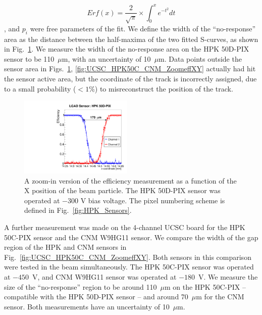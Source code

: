 \documentclass[preprint,1p]{elsarticle}
\begin{document}
\begin{equation} Erf(x)= \frac{2}{\sqrt{\pi}}\times \int_{0}^{x}e^{-t^2}dt
\end{equation} , and $p_i$ were free parameters of the fit. We define the width
of the ``no-response'' area as the distance between the half-maxima of the two
fitted S-curves, as shown in Fig.~\ref{fig:FNAL_HPK50_ZoomeffXY}. We measure the
width of the no-response area on the HPK 50D-PIX sensor to be 110~$\mu$m, with
an uncertainty of 10~$\mu$m. Data points outside the sensor area in
Figs.~\ref{fig:FNAL_HPK50_ZoomeffXY}, \ref{fig:UCSC_HPK50C_CNM_ZoomeffXY}
actually had hit the sensor active area, but the coordinate of the track is incorrectly
assigned, due to a small probability ($<1$\%) to misreconstruct the position of
the track.


\begin{figure}[!htbp] 
\centering
\includegraphics[width=0.48\textwidth]{figs/KUBoard_HPK50DPix_Run638-781/Eff_vs_X_HPK50DPIX_Ch1_2_fit.pdf} 
\caption{A zoom-in version of the efficiency measurement as a function of the X position of the beam particle.
The HPK 50D-PIX sensor was operated at $-300$ V bias voltage. The pixel numbering scheme is defined in Fig.~\ref{fig:HPK_Sensors}.} 
\label{fig:FNAL_HPK50_ZoomeffXY} 
\end{figure} 

A further measurement was made on the 4-channel UCSC board for the HPK 50C-PIX
sensor and the CNM W9HG11 sensor. We compare the width of the gap region of the
HPK and CNM sensors in Fig.~\ref{fig:UCSC_HPK50C_CNM_ZoomeffXY}. Both sensors in
this comparison were tested in the beam simultaneously. The HPK 50C-PIX sensor
was operated at $-450$~V, and CNM W9HG11 sensor was operated at $-180$~V. We
measure the size of the ``no-response'' region to be around 110~$\mu$m on the
HPK 50C-PIX -- compatible with the HPK 50D-PIX sensor -- and around 70~$\mu$m
for the CNM sensor. Both measurements have an uncertainty of 10~$\mu$m.
\end{document}
